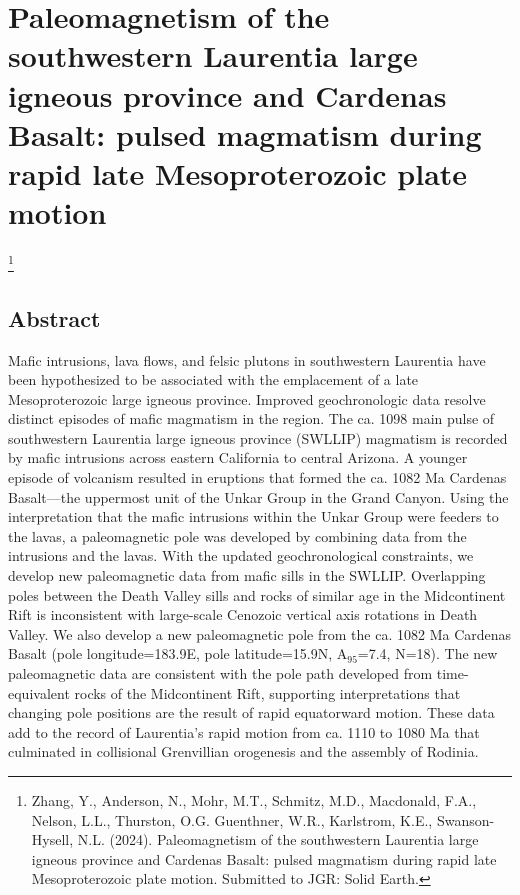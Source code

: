 \chapter[Paleomagnetism of the southwestern Laurentia large igneous province and Cardenas Basalt: pulsed magmatism during rapid late Mesoproterozoic plate motion][southwestern Laurentia large igneous province]{Paleomagnetism of the southwestern Laurentia large igneous province and Cardenas Basalt: pulsed magmatism during rapid late Mesoproterozoic plate motion}

\let\thefootnote\relax\footnote{Zhang, Y., Anderson, N., Mohr, M.T., Schmitz, M.D., Macdonald, F.A., Nelson, L.L., Thurston, O.G. Guenthner, W.R., Karlstrom, K.E., Swanson-Hysell, N.L. (2024). Paleomagnetism of the southwestern Laurentia large igneous province and Cardenas Basalt: pulsed magmatism during rapid late Mesoproterozoic plate motion. Submitted to JGR: Solid Earth.}

\section{Abstract}

Mafic intrusions, lava flows, and felsic plutons in southwestern Laurentia have been hypothesized to be associated with the emplacement of a late Mesoproterozoic large igneous province. Improved geochronologic data resolve distinct episodes of mafic magmatism in the region. The ca. 1098 main pulse of southwestern Laurentia large igneous province (SWLLIP) magmatism is recorded by mafic intrusions across eastern California to central Arizona. A younger episode of volcanism resulted in eruptions that formed the ca. 1082 Ma Cardenas Basalt---the uppermost unit of the Unkar Group in the Grand Canyon. Using the interpretation that the mafic intrusions within the Unkar Group were feeders to the lavas, a paleomagnetic pole was developed by combining data from the intrusions and the lavas. With the updated geochronological constraints, we develop new paleomagnetic data from mafic sills in the SWLLIP. Overlapping poles between the Death Valley sills and rocks of similar age in the Midcontinent Rift is inconsistent with large-scale Cenozoic vertical axis rotations in Death Valley. We also develop a new paleomagnetic pole from the ca. 1082 Ma Cardenas Basalt (pole longitude=183.9\textdegree E, pole latitude=15.9\textdegree N, A$_{95}$=7.4\textdegree, N=18). The new paleomagnetic data are consistent with the pole path developed from time-equivalent rocks of the Midcontinent Rift, supporting interpretations that changing pole positions are the result of rapid equatorward motion. These data add to the record of Laurentia's rapid motion from ca. 1110 to 1080 Ma that culminated in collisional Grenvillian orogenesis and the assembly of Rodinia. 

